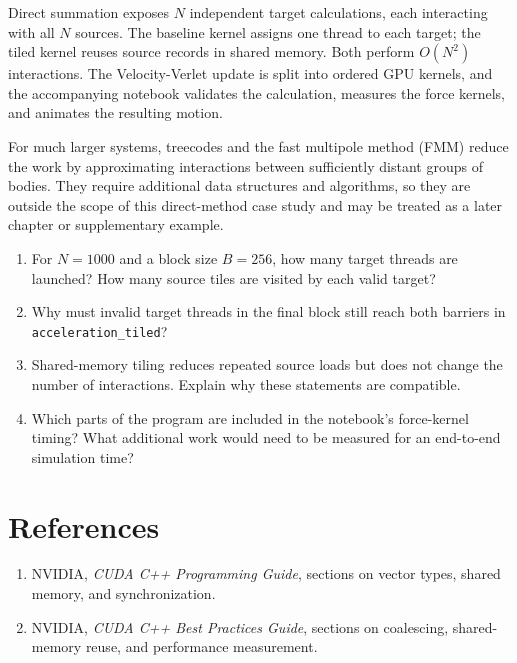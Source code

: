 Direct summation exposes $N$ independent target calculations, each interacting
with all $N$ sources. The baseline kernel assigns one thread to each target;
the tiled kernel reuses source records in shared memory. Both perform
$O(N^2)$ interactions. The Velocity-Verlet update is split into ordered GPU
kernels, and the accompanying notebook validates the calculation, measures
the force kernels, and animates the resulting motion.

For much larger systems, treecodes and the fast multipole method (FMM) reduce
the work by approximating interactions between sufficiently distant groups of
bodies. They require additional data structures and algorithms, so they are
outside the scope of this direct-method case study and may be treated as a
later chapter or supplementary example.

\begin{enumerate}
\item For $N=1000$ and a block size $B=256$, how many target threads are
      launched? How many source tiles are visited by each valid target?
\item Why must invalid target threads in the final block still reach both
      barriers in \lstinline|acceleration_tiled|?
\item Shared-memory tiling reduces repeated source loads but does not change
      the number of interactions. Explain why these statements are
      compatible.
\item Which parts of the program are included in the notebook's force-kernel
      timing? What additional work would need to be measured for an
      end-to-end simulation time?
\end{enumerate}

\section*{References}
\begin{enumerate}
\item NVIDIA, \emph{CUDA C++ Programming Guide}, sections on vector types,
      shared memory, and synchronization.
\item NVIDIA, \emph{CUDA C++ Best Practices Guide}, sections on coalescing,
      shared-memory reuse, and performance measurement.
\end{enumerate}
